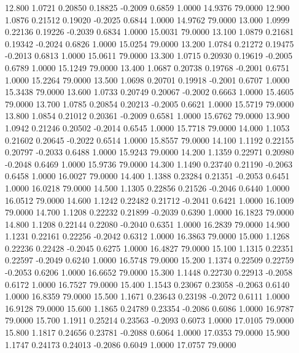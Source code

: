  12.800   1.0721   0.20850   0.18825  -0.2009   0.6859   1.0000  14.9376  79.0000
  12.900   1.0876   0.21512   0.19020  -0.2025   0.6844   1.0000  14.9762  79.0000
  13.000   1.0999   0.22136   0.19226  -0.2039   0.6834   1.0000  15.0031  79.0000
  13.100   1.0879   0.21681   0.19342  -0.2024   0.6826   1.0000  15.0254  79.0000
  13.200   1.0784   0.21272   0.19475  -0.2013   0.6813   1.0000  15.0611  79.0000
  13.300   1.0715   0.20930   0.19619  -0.2005   0.6789   1.0000  15.1249  79.0000
  13.400   1.0687   0.20738   0.19768  -0.2001   0.6751   1.0000  15.2264  79.0000
  13.500   1.0698   0.20701   0.19918  -0.2001   0.6707   1.0000  15.3438  79.0000
  13.600   1.0733   0.20749   0.20067  -0.2002   0.6663   1.0000  15.4605  79.0000
  13.700   1.0785   0.20854   0.20213  -0.2005   0.6621   1.0000  15.5719  79.0000
  13.800   1.0854   0.21012   0.20361  -0.2009   0.6581   1.0000  15.6762  79.0000
  13.900   1.0942   0.21246   0.20502  -0.2014   0.6545   1.0000  15.7718  79.0000
  14.000   1.1053   0.21602   0.20645  -0.2022   0.6514   1.0000  15.8557  79.0000
  14.100   1.1192   0.22155   0.20797  -0.2033   0.6488   1.0000  15.9243  79.0000
  14.200   1.1359   0.22971   0.20980  -0.2048   0.6469   1.0000  15.9736  79.0000
  14.300   1.1490   0.23740   0.21190  -0.2063   0.6458   1.0000  16.0027  79.0000
  14.400   1.1388   0.23284   0.21351  -0.2053   0.6451   1.0000  16.0218  79.0000
  14.500   1.1305   0.22856   0.21526  -0.2046   0.6440   1.0000  16.0512  79.0000
  14.600   1.1242   0.22482   0.21712  -0.2041   0.6421   1.0000  16.1009  79.0000
  14.700   1.1208   0.22232   0.21899  -0.2039   0.6390   1.0000  16.1823  79.0000
  14.800   1.1208   0.22144   0.22080  -0.2040   0.6351   1.0000  16.2839  79.0000
  14.900   1.1231   0.22161   0.22256  -0.2042   0.6312   1.0000  16.3863  79.0000
  15.000   1.1268   0.22236   0.22428  -0.2045   0.6275   1.0000  16.4827  79.0000
  15.100   1.1315   0.22351   0.22597  -0.2049   0.6240   1.0000  16.5748  79.0000
  15.200   1.1374   0.22509   0.22759  -0.2053   0.6206   1.0000  16.6652  79.0000
  15.300   1.1448   0.22730   0.22913  -0.2058   0.6172   1.0000  16.7527  79.0000
  15.400   1.1543   0.23067   0.23058  -0.2063   0.6140   1.0000  16.8359  79.0000
  15.500   1.1671   0.23643   0.23198  -0.2072   0.6111   1.0000  16.9128  79.0000
  15.600   1.1865   0.24789   0.23354  -0.2086   0.6086   1.0000  16.9787  79.0000
  15.700   1.1911   0.25214   0.23563  -0.2093   0.6073   1.0000  17.0105  79.0000
  15.800   1.1817   0.24656   0.23781  -0.2088   0.6064   1.0000  17.0353  79.0000
  15.900   1.1747   0.24173   0.24013  -0.2086   0.6049   1.0000  17.0757  79.0000

